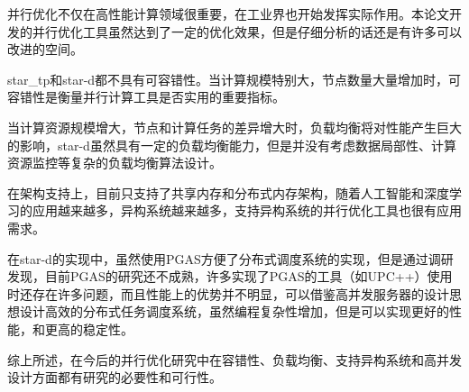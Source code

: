并行优化不仅在高性能计算领域很重要，在工业界也开始发挥实际作用。本论文开发的并行优化工具虽然达到了一定的优化效果，但是仔细分析的话还是有许多可以改进的空间。

star\_tp和star-d都不具有可容错性。当计算规模特别大，节点数量大量增加时，可容错性是衡量并行计算工具是否实用的重要指标。

当计算资源规模增大，节点和计算任务的差异增大时，负载均衡将对性能产生巨大的影响，star-d虽然具有一定的负载均衡能力，但是并没有考虑数据局部性、计算资源监控等复杂的负载均衡算法设计。

在架构支持上，目前只支持了共享内存和分布式内存架构，随着人工智能和深度学习的应用越来越多，异构系统越来越多，支持异构系统的并行优化工具也很有应用需求。

在star-d的实现中，虽然使用PGAS方便了分布式调度系统的实现，但是通过调研发现，目前PGAS的研究还不成熟，许多实现了PGAS的工具（如UPC++）使用时还存在许多问题，而且性能上的优势并不明显，可以借鉴高并发服务器的设计思想设计高效的分布式任务调度系统，虽然编程复杂性增加，但是可以实现更好的性能，和更高的稳定性。

综上所述，在今后的并行优化研究中在容错性、负载均衡、支持异构系统和高并发设计方面都有研究的必要性和可行性。


